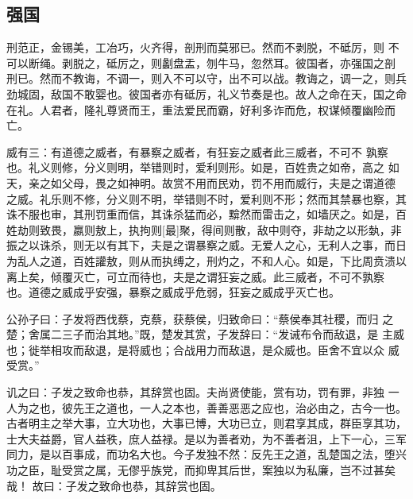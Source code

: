 \documentclass[]{article}
\begin{document}
\hypertarget{header-n72}{%
\subsection{强国}\label{header-n72}}

刑范正，金锡美，工冶巧，火齐得，剖刑而莫邪已。然而不剥脱，不砥厉，则
不可以断绳。剥脱之，砥厉之，则劙盘盂，刎牛马，忽然耳。彼国者，亦强国之剖
刑已。然而不教诲，不调一，则入不可以守，出不可以战。教诲之，调一之，则兵
劲城固，敌国不敢婴也。彼国者亦有砥厉，礼义节奏是也。故人之命在天，国之命
在礼。人君者，隆礼尊贤而王，重法爱民而霸，好利多诈而危，权谋倾覆幽险而亡。

威有三：有道德之威者，有暴察之威者，有狂妄之威者此三威者，不可不
孰察也。礼义则修，分义则明，举错则时，爱利则形。如是，百姓贵之如帝，高之
如天，亲之如父母，畏之如神明。故赏不用而民劝，罚不用而威行，夫是之谓道德
之威。礼乐则不修，分义则不明，举错则不时，爱利则不形；然而其禁暴也察，其
诛不服也审，其刑罚重而信，其诛杀猛而必，黭然而雷击之，如墙厌之。如是，百
姓劫则致畏，嬴则敖上，执拘则{[}最{]}聚，得间则散，敌中则夺，非劫之以形埶，非
振之以诛杀，则无以有其下，夫是之谓暴察之威。无爱人之心，无利人之事，而日
为乱人之道，百姓讙敖，则从而执缚之，刑灼之，不和人心。如是，下比周贲溃以
离上矣，倾覆灭亡，可立而待也，夫是之谓狂妄之威。此三威者，不可不孰察
也。道德之威成乎安强，暴察之威成乎危弱，狂妄之威成乎灭亡也。

公孙子曰：子发将西伐蔡，克蔡，获蔡侯，归致命曰：``蔡侯奉其社稷，而归
之楚；舍属二三子而治其地。''既，楚发其赏，子发辞曰：``发诫布令而敌退，是
主威也；徙举相攻而敌退，是将威也；合战用力而敌退，是众威也。臣舍不宜以众
威受赏。''

讥之曰：子发之致命也恭，其辞赏也固。夫尚贤使能，赏有功，罚有罪，非独
一人为之也，彼先王之道也，一人之本也，善善恶恶之应也，治必由之，古今一也。
古者明主之举大事，立大功也，大事已博，大功已立，则君享其成，群臣享其功，
士大夫益爵，官人益秩，庶人益禄。是以为善者劝，为不善者沮，上下一心，三军
同力，是以百事成，而功名大也。今子发独不然：反先王之道，乱楚国之法，堕兴
功之臣，耻受赏之属，无僇乎族党，而抑卑其后世，案独以为私廉，岂不过甚矣哉！
故曰：子发之致命也恭，其辞赏也固。
\end{document}
